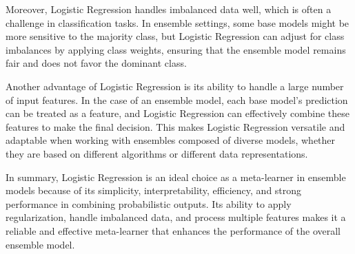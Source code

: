 \vspace{1em}

\noindent
Moreover, Logistic Regression handles imbalanced data well, which is often a challenge in classification tasks. In ensemble settings, some base models might be more sensitive to the majority class, but Logistic Regression can adjust for class imbalances by applying class weights, ensuring that the ensemble model remains fair and does not favor the dominant class.

\vspace{1em}

\noindent
Another advantage of Logistic Regression is its ability to handle a large number of input features. In the case of an ensemble model, each base model's prediction can be treated as a feature, and Logistic Regression can effectively combine these features to make the final decision. This makes Logistic Regression versatile and adaptable when working with ensembles composed of diverse models, whether they are based on different algorithms or different data representations.

\vspace{1em}

\noindent
In summary, Logistic Regression is an ideal choice as a meta-learner in ensemble models because of its simplicity, interpretability, efficiency, and strong performance in combining probabilistic outputs. Its ability to apply regularization, handle imbalanced data, and process multiple features makes it a reliable and effective meta-learner that enhances the performance of the overall ensemble model.






\pagebreak

